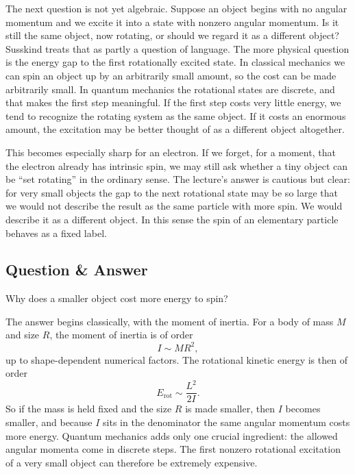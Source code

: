 The next question is not yet algebraic. Suppose an object begins with no angular momentum and we excite it into a state with nonzero angular momentum. Is it still the same object, now rotating, or should we regard it as a different object? Susskind treats that as partly a question of language. The more physical question is the energy gap to the first rotationally excited state. In classical mechanics we can spin an object up by an arbitrarily small amount, so the cost can be made arbitrarily small. In quantum mechanics the rotational states are discrete, and that makes the first step meaningful. If the first step costs very little energy, we tend to recognize the rotating system as the same object. If it costs an enormous amount, the excitation may be better thought of as a different object altogether.

This becomes especially sharp for an electron. If we forget, for a moment, that the electron already has intrinsic spin, we may still ask whether a tiny object can be ``set rotating'' in the ordinary sense. The lecture's answer is cautious but clear: for very small objects the gap to the next rotational state may be so large that we would not describe the result as the same particle with more spin. We would describe it as a different object. In this sense the spin of an elementary particle behaves as a fixed label.

\subsection{Question \& Answer}

Why does a smaller object cost more energy to spin?

The answer begins classically, with the moment of inertia. For a body of mass \(M\) and size \(R\), the moment of inertia is of order
\begin{equation}
I \sim MR^2,
\end{equation}
up to shape-dependent numerical factors. The rotational kinetic energy is then of order
\begin{equation}
E_{\mathrm{rot}} \sim \frac{L^2}{2I}.
\end{equation}
So if the mass is held fixed and the size \(R\) is made smaller, then \(I\) becomes smaller, and because \(I\) sits in the denominator the same angular momentum costs more energy. Quantum mechanics adds only one crucial ingredient: the allowed angular momenta come in discrete steps. The first nonzero rotational excitation of a very small object can therefore be extremely expensive.

